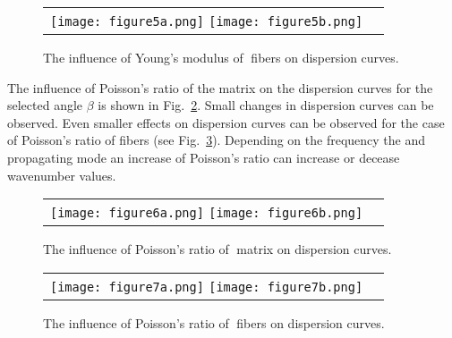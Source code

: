 \documentclass[]{spie}  %
\newcommand{\myfigscale}{0.9}
\begin{document}
\begin{figure} [ht]
	\begin{center}
		\begin{tabular}{cc} %
			\texttt{[image: figure5a.png]}
			\texttt{[image: figure5b.png]}
		\end{tabular}
	\end{center}
	\caption[] 
	{ \label{fig:ef} 
		The influence of Young's modulus of fibers on dispersion curves.}
\end{figure} 
\pagebreak
The influence of  Poisson's ratio of the matrix on the dispersion curves for the selected angle \(\beta\) is shown in Fig.~\ref{fig:nim}. 
Small changes in dispersion curves can be observed.
Even smaller effects on dispersion curves can be observed for the case of Poisson's ratio of fibers (see Fig.~\ref{fig:nif}).
Depending on the frequency the and propagating mode an increase of Poisson's ratio can increase or decease wavenumber values.
\begin{figure} [ht]
	\begin{center}
		\begin{tabular}{cc} %
			\texttt{[image: figure6a.png]}
			\texttt{[image: figure6b.png]}
		\end{tabular}
	\end{center}
	\caption[] 
	{ \label{fig:nim} 
		The influence of Poisson's ratio of matrix on dispersion curves.}
\end{figure} 
\begin{figure} [ht]
	\begin{center}
		\begin{tabular}{cc} %
			\texttt{[image: figure7a.png]}
			\texttt{[image: figure7b.png]}
		\end{tabular}
	\end{center}
	\caption[] 
	{ \label{fig:nif} 
		The influence of Poisson's ratio of fibers on dispersion curves.}
\end{figure} 
\end{document}
